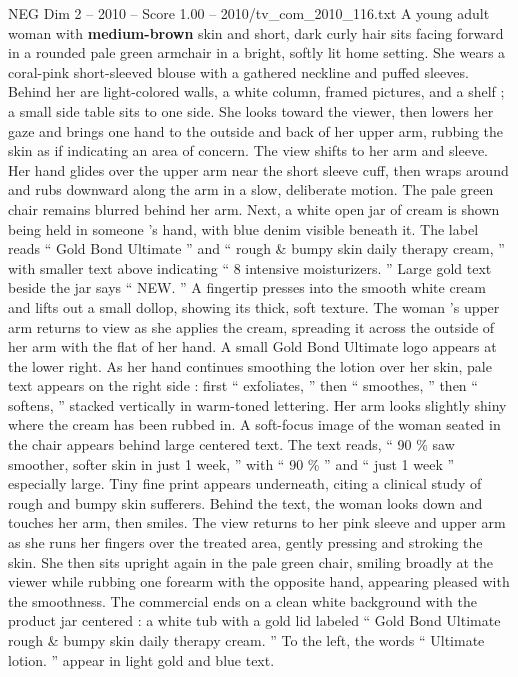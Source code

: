 \begin{textsample}{NEG Dim 2 – 2010 – Score 1.00 – 2010/tv\_com\_2010\_116.txt}  \label{ex:f2_neg_045}
A young adult woman with \textbf{medium-brown} skin and short, dark curly hair sits facing forward in a rounded pale green armchair in a bright, softly lit home setting.
She wears a coral-pink short-sleeved blouse with a gathered neckline and puffed sleeves.
Behind her are light-colored walls, a white column, framed pictures, and a shelf ; a small side table sits to one side.
She looks toward the viewer, then lowers her gaze and brings one hand to the outside and back of her upper arm, rubbing the skin as if indicating an area of concern.
The view shifts to her arm and sleeve.
Her hand glides over the upper arm near the short sleeve cuff, then wraps around and rubs downward along the arm in a slow, deliberate motion.
The pale green chair remains blurred behind her arm.
Next, a white open jar of cream is shown being held in someone ’s hand, with blue denim visible beneath it.
The label reads “ Gold Bond Ultimate ” and “ rough \& bumpy skin daily therapy cream, ” with smaller text above indicating “ 8 intensive moisturizers. ” Large gold text beside the jar says “ NEW. ” A fingertip presses into the smooth white cream and lifts out a small dollop, showing its thick, soft texture.
The woman ’s upper arm returns to view as she applies the cream, spreading it across the outside of her arm with the flat of her hand.
A small Gold Bond Ultimate logo appears at the lower right.
As her hand continues smoothing the lotion over her skin, pale text appears on the right side : first “ exfoliates, ” then “ smoothes, ” then “ softens, ” stacked vertically in warm-toned lettering.
Her arm looks slightly shiny where the cream has been rubbed in.
A soft-focus image of the woman seated in the chair appears behind large centered text.
The text reads, “ 90 \% saw smoother, softer skin in just 1 week, ” with “ 90 \% ” and “ just 1 week ” especially large.
Tiny fine print appears underneath, citing a clinical study of rough and bumpy skin sufferers.
Behind the text, the woman looks down and touches her arm, then smiles.
The view returns to her pink sleeve and upper arm as she runs her fingers over the treated area, gently pressing and stroking the skin.
She then sits upright again in the pale green chair, smiling broadly at the viewer while rubbing one forearm with the opposite hand, appearing pleased with the smoothness.
The commercial ends on a clean white background with the product jar centered : a white tub with a gold lid labeled “ Gold Bond Ultimate rough \& bumpy skin daily therapy cream. ” To the left, the words “ Ultimate lotion. ” appear in light gold and blue text.

\end{textsample}
